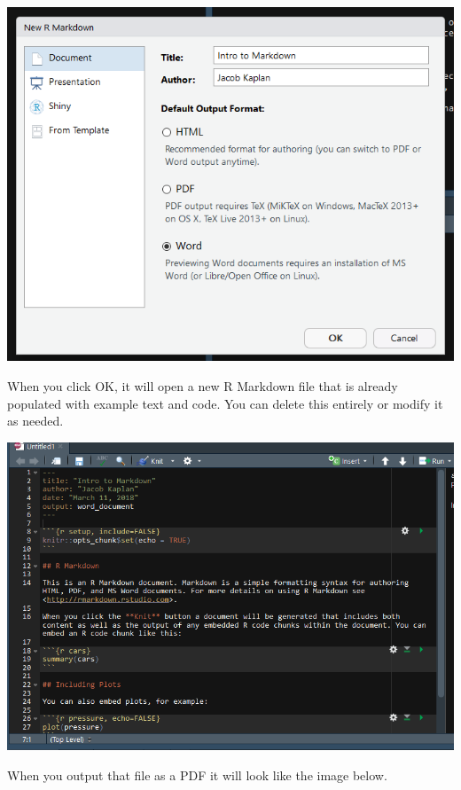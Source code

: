 \documentclass[
]{krantz}
\begin{document}
\includegraphics{images/markdown2.png}

When you click OK, it will open a new R Markdown file that is already populated with example text and code. You can delete this entirely or modify it as needed.

\includegraphics{images/markdown6.png}

When you output that file as a PDF it will look like the image below.
\end{document}
